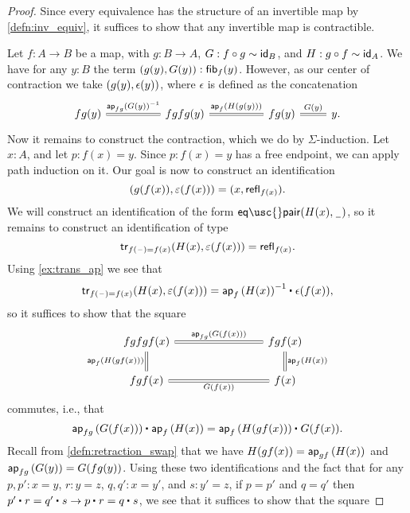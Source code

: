 \begin{proof}
Since every equivalence has the structure of an invertible map by \autoref{defn:inv_equiv}, it suffices to show that any invertible map is contractible.

Let $f:A\to B$ be a map, with $g:B\to A$, $G:f\circ g\htpy\idfunc[B]$, and $H:g\circ f\htpy \idfunc[A]$.
We have for any $y:B$ the term $\pairr{g(y),G(y)}:\fib{f}{y}$. However, as our center of contraction we take
$\pairr{g(y),\epsilon(y)}$, where $\epsilon$ is defined as the concatenation
\begin{equation*}
\begin{tikzcd}
fg(y) \arrow[r,equals,"\ap{fg}{G(y)}^{-1}"] &[2.5em] fgfg(y) \arrow[r,equals,"\ap{f}{H(g(y))}"] &[2.5em] fg(y) \arrow[r,equals,"G(y)"] & y.
\end{tikzcd}
\end{equation*}
Now it remains to construct the contraction, which we do by $\Sigma$-induction. 
Let $x:A$, and let $p:f(x)=y$.
Since $p:f(x)=y$ has a free endpoint, we can apply path induction on it. 
Our goal is now to construct an identification
\begin{equation*}
\pairr{g(f(x)),\varepsilon(f(x))}=\pairr{x,\refl{f(x)}}.
\end{equation*}
We will construct an identification of the form $\mathsf{eq\usc{}pair}(H(x),\nameless)$,
so it remains to construct an identification of type
\begin{equation*}
\mathsf{tr}_{f(\blank)=f(x)}(H(x),\varepsilon(f(x)))=\refl{f(x)}.
\end{equation*}
Using \autoref{ex:trans_ap} we see that
\begin{equation*}
\mathsf{tr}_{f(\blank)=f(x)}(H(x),\varepsilon(f(x)))= \ct{\ap{f}{H(x)}^{-1}}{\epsilon(f(x))},
\end{equation*}
so it suffices to show that the square
\begin{equation*}
\begin{tikzcd}[column sep=8em]
fgfgf(x) \arrow[r,equals,"\ap{fg}{G(f(x))}"] \arrow[d,equals,swap,"\ap{f}{H(gf(x))}"] & fgf(x) \arrow[d,equals,"\ap{f}{H(x)}"] \\
fgf(x) \arrow[r,equals,swap,"G(f(x))"] & f(x)
\end{tikzcd}
\end{equation*}
commutes, i.e., that 
\begin{equation*}
\ct{\ap{fg}{G(f(x))}}{\ap{f}{H(x)}}=\ct{\ap{f}{H(gf(x))}}{G(f(x))}.
\end{equation*}
Recall from \autoref{defn:retraction_swap} that we have $H(gf(x))=\ap{gf}{H(x)}$ and $\ap{fg}{G(y)}=G(fg(y))$. Using these two identifications and the fact that for any $p,p':x=y$, $r:y=z$, $q,q':x=y'$, and $s:y'=z$, if $p=p'$ and $q=q'$ then $\ct{p'}{r}=\ct{q'}{s}\to \ct{p}{r}=\ct{q}{s}$, we see that it suffices to show that the square

\end{proof}

